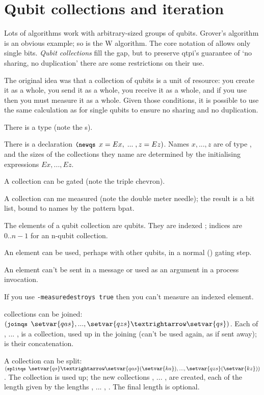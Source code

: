 
\chapter{Qubit collections and iteration}

Lots of algorithms work with arbitrary-sized groups of qubits. Grover's algorithm is an obvious example; so is the W algorithm. The core notation of  allows only single bits. \emph{Qubit collections} fill the gap, but to preserve qtpi's guarantee of `no sharing, no duplication' there are some restrictions on their use.

The original idea was that a collection of  qubits is a unit of resource: you create it as a whole, you send it as a whole, you receive it as a whole, and if you use  then you must measure it as a whole. Given those conditions, it is possible to use the same calculation as for single qubits to ensure no sharing and no duplication. 

\begin{itemize*}
\item There is a type  (note the s).
\item There is a declaration $\texttt{\small{}(newqs } x=Ex, \;...\; ,z=Ez )$. Names $x, ... ,z$ are of type , and the sizes of the collections they name are determined by the initialising expressions $Ex, ..., Ez$.
\item A collection can be gated  (note the triple chevron).
\item A collection can me measured  (note the double meter needle); the result is a bit list, bound to names by the pattern bpat.
\item The elements of a qubit collection are qubits. They are indexed ; indices are $0..n-1$ for an n-qubit collection. 
\begin{itemize*}
\item An element can be used, perhaps with other qubits, in a normal (\verbtt{>>}) gating step.
\item An element can't be sent in a message or used as an argument in a process invocation.
\item If you use \verb|-measuredestroys true| then you can't measure an indexed element.
\end{itemize*}
\item collections can be joined: $(\verbtt{joinqs } \setvar{qas}, ... , \setvar{qzs} → \setvar{qs})$. Each of , ... ,  is a collection, used up in the joining (can't be used again, as if sent away);  is their concatenation.
\item A collection can be split: $(\verbtt{splitqs } \setvar{qs} → \setvar{qas}(\setvar{ka}), ... , \setvar{qzs}(\setvar{kz}))$. The collection  is used up; the new collections , ... ,  are created, each of the length given by the lengths , ... , . The final length  is optional.
\end{itemize*}


